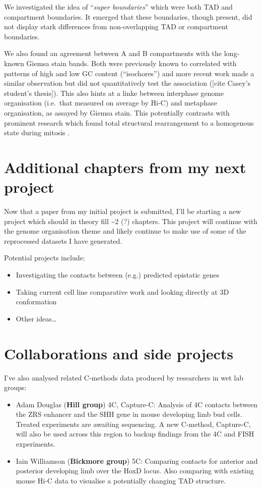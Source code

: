 \documentclass[a4paper,10pt,oneside]{book}
\begin{document}
We investigated the idea of ``\emph{super boundaries}'' which were both
TAD and compartment boundaries. It emerged that these boundaries, though
present, did not display stark differences from non-overlapping TAD or
compartment boundaries.

We also found an agreement between A and B compartments with the
long-known Giemsa stain bands. Both were previously known to correlated
with patterns of high and low GC content (``isochores'') and more recent
work made a similar observation but did not quantitatively test the
association ({[}cite Casey's student's thesis{]}). This also hints at a
linke between interphase genome organisation (i.e.~that measured on
average by Hi-C) and metaphase organisation, as assayed by Giemsa stain.
This potentially contrasts with prominent research which found total
structural rearrangement to a homogenous state during mitosis
\cite{Naumova2013}.

\section{Additional chapters from my next
project}\label{additional-chapters-from-my-next-project}

Now that a paper from my initial project is submitted, I'll be starting
a new project which should in theory fill \textasciitilde{}2 (?)
chapters. This project will continue with the genome organisation theme
and likely continue to make use of some of the reprocessed datasets I
have generated.

Potential projects include:

\begin{itemize}
\itemsep1pt\parskip0pt
\item
  Investigating the contacts between (e.g.) predicted epistatic genes
\item
  Taking current cell line comparative work and looking directly at 3D
  conformation
\item
  Other ideas\ldots
\end{itemize}

\section{Collaborations and side
projects}\label{collaborations-and-side-projects}

I've also analysed related C-methods data produced by researchers in wet
lab groups:

\begin{itemize}
\item
  Adam Douglas (\textbf{Hill group}) 4C, Capture-C: Analysis of 4C
  contacts between the ZRS enhancer and the SHH gene in mouse developing
  limb bud cells. Treated experiments are awaiting sequencing. A new
  C-method, Capture-C, will also be used across this region to backup
  findings from the 4C and FISH experiments.
\item
  Iain Williamson (\textbf{Bickmore group}) 5C: Comparing contacts for
  anterior and posterior developing limb over the HoxD locus. Also
  comparing with existing mouse Hi-C data to visualise a potentially
  changing TAD structure.
\end{itemize}
\end{document}
